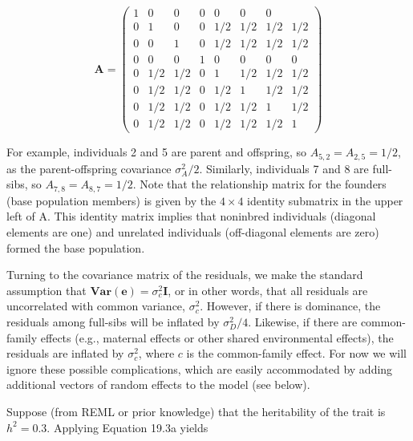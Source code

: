 \documentclass{article}
\begin{document}
\begin{equation}
\mathbf{A}=\begin{pmatrix}{{{1}}}&{{{0}}}&{{{0}}}&{{{0}}}&{{{0}}}&{{{0}}}&{{{0}}} \\{{{0}}}&{{{1}}}&{{{0}}}&{{{0}}}&{{{1/2}}}&{{{1/2}}}&{{{1/2}}}&{{{1/2}}} \\{{{0}}}&{{{0}}}&{{{1}}}&{{{0}}}&{{{1/2}}}&{{{1/2}}}&{{{1/2}}}&{{{1/2}}} \\{{{0}}}&{{{0}}}&{{{0}}}&{{{1}}}&{{{0}}}&{{{0}}}&{{{0}}}&{{{0}}} \\{{{0}}}&{{{1/2}}}&{{{1/2}}}&{{{0}}}&{{{1}}}&{{{1/2}}}&{{{1/2}}}&{{{1/2}}} \\{{{0}}}&{{{1/2}}}&{{{1/2}}}&{{{0}}}&{{{1/2}}}&{{{1}}}&{{{1/2}}}&{{{1/2}}} \\{{{0}}}&{{{1/2}}}&{{{1/2}}}&{{{0}}}&{{{1/2}}}&{{{1/2}}}&{{{1}}}&{{{1/2}}} \\{{{0}}}&{{{1/2}}}&{{{1/2}}}&{{{0}}}&{{{1/2}}}&{{{1/2}}}&{{{1/2}}}&{{{1}}}\end{pmatrix}
\end{equation}

For example, individuals 2 and 5 are parent and offspring, so  $ A_{5,2} = A_{2,5} = 1/2 $, as the parent-offspring covariance  $ \sigma_A^2/2 $. Similarly, individuals 7 and 8 are full-sibs, so  $ A_{7,8} = A_{8,7} = 1/2 $. Note that the relationship matrix for the founders (base population members) is given by the  $ 4 \times 4 $ identity submatrix in the upper left of A. This identity matrix implies that noninbred individuals (diagonal elements are one) and unrelated individuals (off-diagonal elements are zero) formed the base population.

Turning to the covariance matrix of the residuals, we make the standard assumption that  $ \mathbf{Var}\left(\mathbf{e}\right) = \sigma_c^2 \mathbf{I} $, or in other words, that all residuals are uncorrelated with common variance,  $ \sigma_c^2 $. However, if there is dominance, the residuals among full-sibs will be inflated by  $ \sigma_D^2 / 4 $. Likewise, if there are common-family effects (e.g., maternal effects or other shared environmental effects), the residuals are inflated by  $ \sigma_c^2 $, where  $ c $ is the common-family effect. For now we will ignore these possible complications, which are easily accommodated by adding additional vectors of random effects to the model (see below).

Suppose (from REML or prior knowledge) that the heritability of the trait is  $ h^{2} = 0.3 $. Applying Equation 19.3a yields
\end{document}
